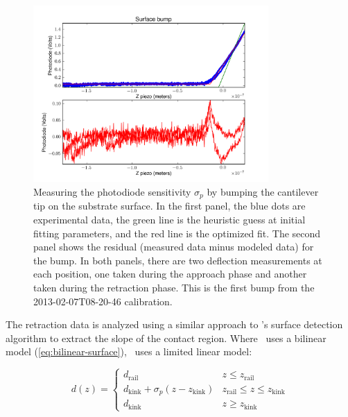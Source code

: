 \begin{figure}
  \begin{center}
    \includegraphics[width=0.8\textwidth]{figures/calibcant/bump}
    \caption{Measuring the photodiode sensitivity $\sigma_p$ by
      bumping the cantilever tip on the substrate surface.  In the
      first panel, the blue dots are experimental data, the green line
      is the heuristic guess at initial fitting parameters, and the
      red line is the optimized fit.  The second panel shows the
      residual (measured data minus modeled data) for the bump.  In
      both panels, there are two deflection measurements at each
      position, one taken during the approach phase and another taken
      during the retraction phase.  This is the first bump from the
      2013-02-07T08-20-46 calibration.\label{fig:calibcant:bump}}
  \end{center}
\end{figure}

The retraction data is analyzed using a similar approach to \pypiezo's
surface detection algorithm to extract the slope of the contact
region.  Where \pypiezo\ uses a bilinear model
(\cref{eq:bilinear-surface}), \calibcant\ uses a limited linear model:

\begin{equation}
  d(z) = \begin{cases}
      d_\text{rail}  &  z \le z_\text{rail} \\
      d_\text{kink} + \sigma_p (z - z_\text{kink})
        &  z_\text{rail} \le z \le z_\text{kink} \\
      d_\text{kink}  &  z \ge z_\text{kink}
    \end{cases}
  \label{eq:limited-linear-surface}
\end{equation}

